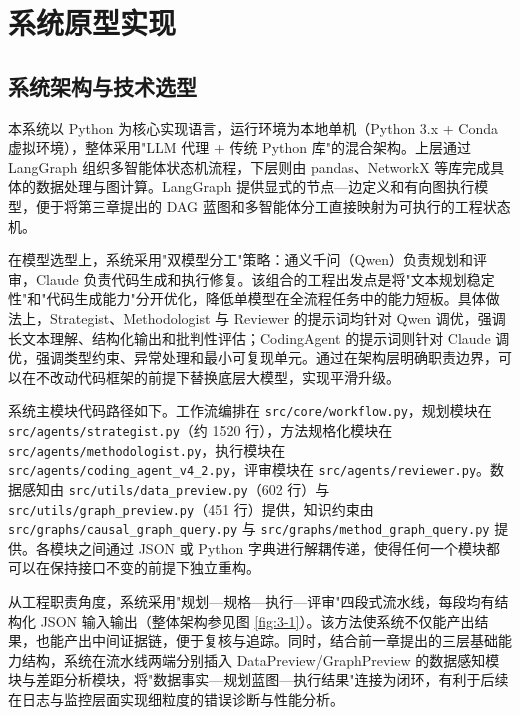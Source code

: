 
\section{系统原型实现}

\subsection{系统架构与技术选型}

本系统以 Python 为核心实现语言，运行环境为本地单机（Python 3.x + Conda 虚拟环境），整体采用"LLM 代理 + 传统 Python 库"的混合架构。上层通过 LangGraph\cite{langgraph2024} 组织多智能体状态机流程，下层则由 pandas、NetworkX 等库完成具体的数据处理与图计算。LangGraph 提供显式的节点—边定义和有向图执行模型，便于将第三章提出的 DAG 蓝图和多智能体分工直接映射为可执行的工程状态机。

在模型选型上，系统采用"双模型分工"策略：通义千问（Qwen）负责规划和评审，Claude 负责代码生成和执行修复。该组合的工程出发点是将"文本规划稳定性"和"代码生成能力"分开优化，降低单模型在全流程任务中的能力短板\cite{zhao2024llm,brown2020language}。具体做法上，Strategist、Methodologist 与 Reviewer 的提示词均针对 Qwen 调优，强调长文本理解、结构化输出和批判性评估；CodingAgent 的提示词则针对 Claude 调优，强调类型约束、异常处理和最小可复现单元。通过在架构层明确职责边界，可以在不改动代码框架的前提下替换底层大模型，实现平滑升级。

系统主模块代码路径如下。工作流编排在 \texttt{src/core/\allowbreak workflow.py}，规划模块在 \texttt{src/agents/\allowbreak strategist.py}（约 1520 行），方法规格化模块在 \texttt{src/agents/\allowbreak methodologist.py}，执行模块在 \texttt{src/agents/\allowbreak coding\_agent\_v4\_2.py}，评审模块在 \texttt{src/agents/\allowbreak reviewer.py}。数据感知由 \texttt{src/utils/\allowbreak data\_preview.py}（602 行）与 \texttt{src/utils/\allowbreak graph\_preview.py}（451 行）提供，知识约束由 \texttt{src/graphs/\allowbreak causal\_graph\_query.py} 与 \texttt{src/graphs/\allowbreak method\_graph\_query.py} 提供。各模块之间通过 JSON 或 Python 字典进行解耦传递，使得任何一个模块都可以在保持接口不变的前提下独立重构。

从工程职责角度，系统采用"规划—规格—执行—评审"四段式流水线，每段均有结构化 JSON 输入输出（整体架构参见图 \ref{fig:3-1}）。该方法使系统不仅能产出结果，也能产出中间证据链，便于复核与追踪\cite{hong2024metagpt,langgraph2024}。同时，结合前一章提出的三层基础能力结构，系统在流水线两端分别插入 DataPreview/GraphPreview 的数据感知模块与差距分析模块，将"数据事实—规划蓝图—执行结果"连接为闭环，有利于后续在日志与监控层面实现细粒度的错误诊断与性能分析。

